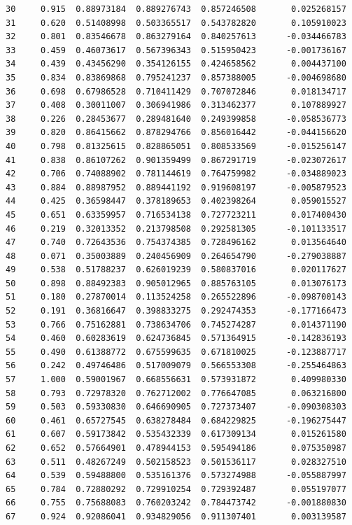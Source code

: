 \documentclass[
  letterpaper,
  DIV=11,
  numbers=noendperiod]{scrartcl}
\begin{document}
\begin{verbatim}
30     0.915  0.88973184  0.889276743  0.857246508       0.025268157
31     0.620  0.51408998  0.503365517  0.543782820       0.105910023
32     0.801  0.83546678  0.863279164  0.840257613      -0.034466783
33     0.459  0.46073617  0.567396343  0.515950423      -0.001736167
34     0.439  0.43456290  0.354126155  0.424658562       0.004437100
35     0.834  0.83869868  0.795241237  0.857388005      -0.004698680
36     0.698  0.67986528  0.710411429  0.707072846       0.018134717
37     0.408  0.30011007  0.306941986  0.313462377       0.107889927
38     0.226  0.28453677  0.289481640  0.249399858      -0.058536773
39     0.820  0.86415662  0.878294766  0.856016442      -0.044156620
40     0.798  0.81325615  0.828865051  0.808533569      -0.015256147
41     0.838  0.86107262  0.901359499  0.867291719      -0.023072617
42     0.706  0.74088902  0.781144619  0.764759982      -0.034889023
43     0.884  0.88987952  0.889441192  0.919608197      -0.005879523
44     0.425  0.36598447  0.378189653  0.402398264       0.059015527
45     0.651  0.63359957  0.716534138  0.727723211       0.017400430
46     0.219  0.32013352  0.213798508  0.292581305      -0.101133517
47     0.740  0.72643536  0.754374385  0.728496162       0.013564640
48     0.071  0.35003889  0.240456909  0.264654790      -0.279038887
49     0.538  0.51788237  0.626019239  0.580837016       0.020117627
50     0.898  0.88492383  0.905012965  0.885763105       0.013076173
51     0.180  0.27870014  0.113524258  0.265522896      -0.098700143
52     0.191  0.36816647  0.398833275  0.292474353      -0.177166473
53     0.766  0.75162881  0.738634706  0.745274287       0.014371190
54     0.460  0.60283619  0.624736845  0.571364915      -0.142836193
55     0.490  0.61388772  0.675599635  0.671810025      -0.123887717
56     0.242  0.49746486  0.517009079  0.566553308      -0.255464863
57     1.000  0.59001967  0.668556631  0.573931872       0.409980330
58     0.793  0.72978320  0.762712002  0.776647085       0.063216800
59     0.503  0.59330830  0.646690905  0.727373407      -0.090308303
60     0.461  0.65727545  0.638278484  0.684229825      -0.196275447
61     0.607  0.59173842  0.535432339  0.617309134       0.015261580
62     0.652  0.57664901  0.478944153  0.595494186       0.075350987
63     0.511  0.48267249  0.502158523  0.501536117       0.028327510
64     0.539  0.59488800  0.535161376  0.573274988      -0.055887997
65     0.784  0.72880292  0.729910254  0.729392487       0.055197077
66     0.755  0.75688083  0.760203242  0.784473742      -0.001880830
67     0.924  0.92086041  0.934829056  0.911307401       0.003139587

\end{verbatim}
\end{document}
